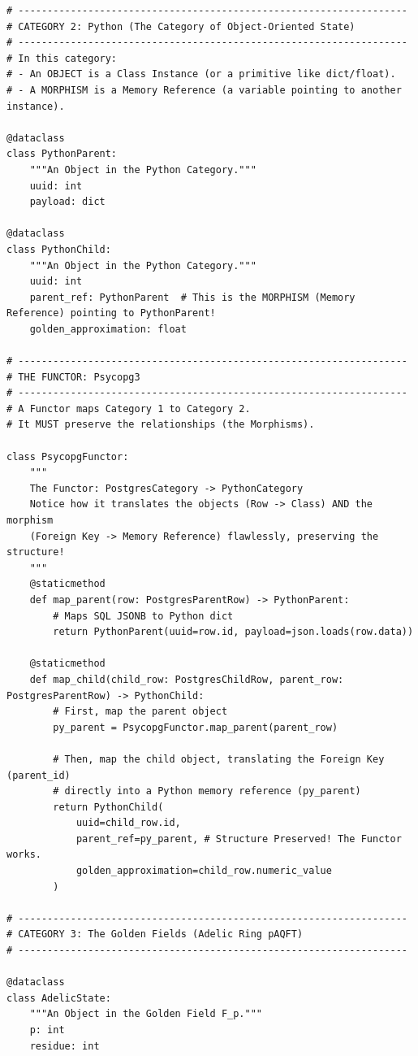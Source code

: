 \begin{verbatim}
# -------------------------------------------------------------------
# CATEGORY 2: Python (The Category of Object-Oriented State)
# -------------------------------------------------------------------
# In this category:
# - An OBJECT is a Class Instance (or a primitive like dict/float).
# - A MORPHISM is a Memory Reference (a variable pointing to another instance).

@dataclass
class PythonParent:
    """An Object in the Python Category."""
    uuid: int
    payload: dict

@dataclass
class PythonChild:
    """An Object in the Python Category."""
    uuid: int
    parent_ref: PythonParent  # This is the MORPHISM (Memory Reference) pointing to PythonParent!
    golden_approximation: float

# -------------------------------------------------------------------
# THE FUNCTOR: Psycopg3
# -------------------------------------------------------------------
# A Functor maps Category 1 to Category 2. 
# It MUST preserve the relationships (the Morphisms).

class PsycopgFunctor:
    """
    The Functor: PostgresCategory -> PythonCategory
    Notice how it translates the objects (Row -> Class) AND the morphism 
    (Foreign Key -> Memory Reference) flawlessly, preserving the structure!
    """
    @staticmethod
    def map_parent(row: PostgresParentRow) -> PythonParent:
        # Maps SQL JSONB to Python dict
        return PythonParent(uuid=row.id, payload=json.loads(row.data))

    @staticmethod
    def map_child(child_row: PostgresChildRow, parent_row: PostgresParentRow) -> PythonChild:
        # First, map the parent object
        py_parent = PsycopgFunctor.map_parent(parent_row)
        
        # Then, map the child object, translating the Foreign Key (parent_id)
        # directly into a Python memory reference (py_parent)
        return PythonChild(
            uuid=child_row.id,
            parent_ref=py_parent, # Structure Preserved! The Functor works.
            golden_approximation=child_row.numeric_value
        )

# -------------------------------------------------------------------
# CATEGORY 3: The Golden Fields (Adelic Ring pAQFT)
# -------------------------------------------------------------------

@dataclass
class AdelicState:
    """An Object in the Golden Field F_p."""
    p: int
    residue: int
    

\end{verbatim}
